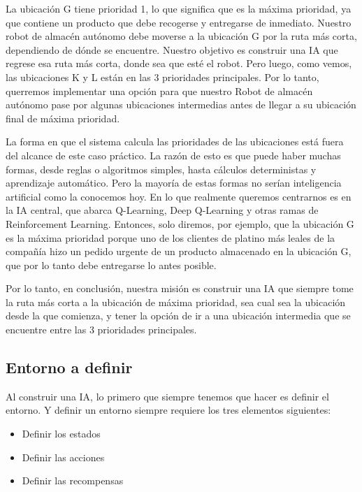 \documentclass[
]{book}
\providecommand{\tightlist}{%
  \setlength{\itemsep}{0pt}\setlength{\parskip}{0pt}}
\begin{document}
La ubicación G tiene prioridad 1, lo que significa que es la máxima prioridad, ya que contiene un producto que debe recogerse y entregarse de inmediato. Nuestro robot de almacén autónomo debe moverse a la ubicación G por la ruta más corta, dependiendo de dónde se encuentre. Nuestro objetivo es construir una IA que regrese esa ruta más corta, donde sea que esté el robot. Pero luego, como vemos, las ubicaciones K y L están en las 3 prioridades principales. Por lo tanto, querremos implementar una opción para que nuestro Robot de almacén autónomo pase por algunas ubicaciones intermedias antes de llegar a su ubicación final de máxima prioridad.

La forma en que el sistema calcula las prioridades de las ubicaciones está fuera del alcance de este caso práctico. La razón de esto es que puede haber muchas formas, desde reglas o algoritmos simples, hasta cálculos deterministas y aprendizaje automático. Pero la mayoría de estas formas no serían inteligencia artificial como la conocemos hoy. En lo que realmente queremos centrarnos es en la IA central, que abarca Q-Learning, Deep Q-Learning y otras ramas de Reinforcement Learning. Entonces, solo diremos, por ejemplo, que la ubicación G es la máxima prioridad porque uno de los clientes de platino más leales de la compañía hizo un pedido urgente de un producto almacenado en la ubicación G, que por lo tanto debe entregarse lo antes posible.

Por lo tanto, en conclusión, nuestra misión es construir una IA que siempre tome la ruta más corta a la ubicación de máxima prioridad, sea cual sea la ubicación desde la que comienza, y tener la opción de ir a una ubicación intermedia que se encuentre entre las 3 prioridades principales.

\hypertarget{entorno-a-definir}{%
\subsection{Entorno a definir}\label{entorno-a-definir}}

Al construir una IA, lo primero que siempre tenemos que hacer es definir el entorno. Y definir un entorno siempre requiere los tres elementos siguientes:

\begin{itemize}
\tightlist
\item
  Definir los estados
\item
  Definir las acciones
\item
  Definir las recompensas
\end{itemize}
\end{document}
